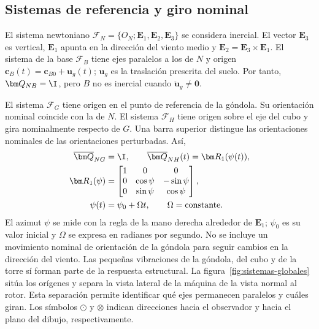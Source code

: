 

\subsection{Sistemas de referencia y giro nominal}
El sistema newtoniano $\mathcal F_N=\{O_N;\bm E_1,\bm E_2,\bm E_3\}$ se considera inercial. El vector $\bm E_3$ es vertical, $\bm E_1$ apunta en la dirección del viento medio y $\bm E_2=\bm E_3\times\bm E_1$. El sistema de la base $\mathcal F_B$ tiene ejes paralelos a los de $N$ y origen $\bm c_B(t)=\bm c_{B0}+\bm u_g(t)$; $\bm u_g$ es la traslación prescrita del suelo. Por tanto, $\bm Q_{NB}=\I$, pero $B$ no es inercial cuando $\ddot{\bm u}_g\ne\bm0$.

El sistema $\mathcal F_G$ tiene origen en el punto de referencia de la góndola. Su orientación nominal coincide con la de $N$. El sistema $\mathcal F_H$ tiene origen sobre el eje del cubo y gira nominalmente respecto de $G$. Una barra superior distingue las orientaciones nominales de las orientaciones perturbadas. Así,
\begin{align}
\overline{\bm Q}_{NG}&=\I,\qquad
\overline{\bm Q}_{NH}(t)=\bm R_1(\psi(t)),\nonumber\\
\bm R_1(\psi)&=
\begin{bmatrix}1&0&0\\0&\cos\psi&-\sin\psi\\0&\sin\psi&\cos\psi\end{bmatrix},\nonumber\\
\psi(t)&=\psi_0+\Omega t,\qquad \Omega=\text{constante}.
\label{eq:rotacion-nominal}
\end{align}
El azimut $\psi$ se mide con la regla de la mano derecha alrededor de $\bm E_1$; $\psi_0$ es su valor inicial y $\Omega$ se expresa en radianes por segundo. No se incluye un movimiento nominal de orientación de la góndola para seguir cambios en la dirección del viento. Las pequeñas vibraciones de la góndola, del cubo y de la torre sí forman parte de la respuesta estructural.
La figura~\ref{fig:sistemas-globales} sitúa los orígenes y separa la vista lateral de la máquina de la vista normal al rotor. Esta separación permite identificar qué ejes permanecen paralelos y cuáles giran. Los símbolos $\odot$ y $\otimes$ indican direcciones hacia el observador y hacia el plano del dibujo, respectivamente.




